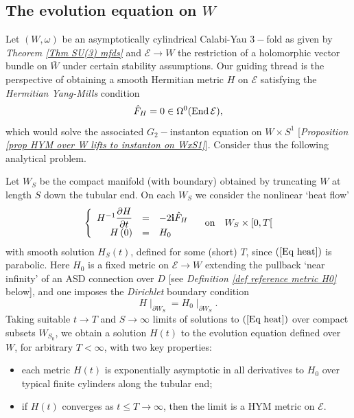 \documentclass{article}
\newcommand{\func}[1]{\textnormal {#1\,}}
\newcommand{\mc}[1]{\mathcal{#1}}
\begin{document}
\subsection{\texorpdfstring
        {The evolution equation on $W$}
        {The evolution equation on W}}
\label{Sec evolution equation on W}

Let $\left( W,\omega \right) $ be an asymptotically cylindrical Calabi-Yau $3-$fold as given by \emph{Theorem \ref{Thm SU(3) mfds}} and $\mathcal{E}%
\rightarrow W$ the restriction of a holomorphic vector bundle on $\bar{W}$ under certain stability assumptions. Our guiding thread is the perspective of
obtaining a smooth Hermitian metric $H$ on $\mathcal{E}$ satisfying the 
\emph{Hermitian Yang-Mills} condition%
\begin{equation}        \label{Eq HYM}
        \hat{F}_{H}=0\in\Omega^0(\func{End}\mc{E}),
\end{equation}%
which would  solve the associated $G_2-$instanton equation on $W\times S^1$ [\emph{Proposition \ref{prop HYM over W lifts to instanton on WxS1}}]. Consider thus the following analytical problem.
 
Let $W_{S}$ be the compact manifold (with boundary) obtained by
truncating $W$ at length $S$ down the tubular end. On each $W_{S}$ we consider the nonlinear
`heat flow'%
\index{evolution equation!on WSx[0,T[@on $W_{S}\times \left[ 0,T\right[ $}%
\begin{equation}
\left\{ 
\begin{array}{r c l}
        H^{-1}\dfrac{\partial H}{\partial t}&=&-2\mathbf{i}\hat{F}_{H}\\
        H\left( 0\right) &=&H_{0}%
\end{array}%
\right. \text{\quad on\quad }W_{S}\times \left[ 0,T\right[   \label{Eq heat}
\end{equation}%
with smooth solution $H_{S}\left( t\right) $, defined for some (short) $T$, since $\left( \ref{Eq heat}\right) $ is parabolic. Here  $H_{0}$ is
a fixed metric on $\mathcal{E}\rightarrow W$ extending  the pullback `near infinity' of an ASD connection over $D$ [see \emph{Definition \ref{def reference metric H0}} below], and one imposes the \emph{Dirichlet} boundary condition
\begin{equation}        \label{Dirichlet}
        H\mid _{\partial W_{S}}=H_{0}\mid _{\partial W_{S}}.  
\end{equation}%
Taking suitable $t\rightarrow T$ and $S\rightarrow \infty $ limits of
solutions to $\left( \ref{Eq heat}\right) $ over compact subsets $W_{S_0}$, we obtain a solution $%
H\left( t\right) $ to the evolution equation  defined over $W$, for arbitrary  $T<\infty$, with two key properties:
\begin{itemize}
        \item 
        each metric $H\left( t\right) $ is exponentially asymptotic in all
derivatives to $H_{0}$ over typical finite cylinders along the tubular end;
        \item 
        if $H\left( t\right) $ converges as $t\leq T\rightarrow \infty$, then the limit is a HYM metric on $\mathcal{E}$.
\end{itemize}
 
\end{document}
